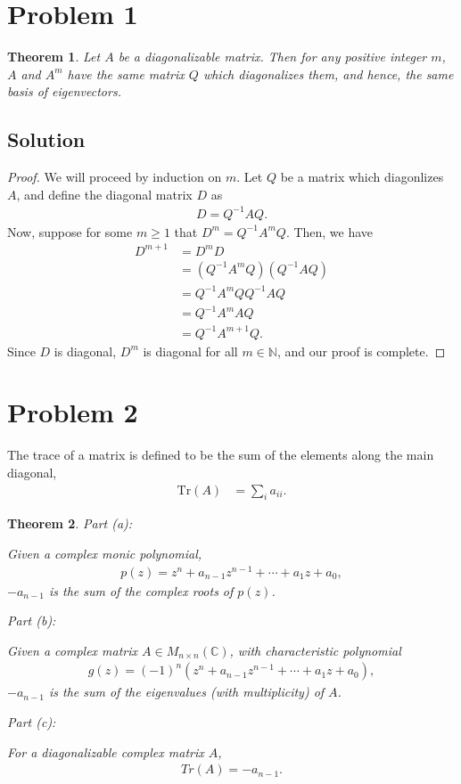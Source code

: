 \documentclass[10pt,a4paper]{article}
\author{Jeremiah Givens}
\makeatletter
\newtheorem{theorem}{Theorem}
\newcommand{\proofpart}[2]{%
  \par
  \addvspace{\medskipamount}%
  \noindent\emph{Part #1: #2}\par\nobreak
  \addvspace{\smallskipamount}%
  \@afterheading
}
\theoremstyle{definition}
\makeatother
\begin{document}
\section*{Problem 1}
\begin{theorem}
Let $A$ be a diagonalizable matrix. Then for any positive integer $m$, $A$ and $A^m$ have the same matrix $Q$ which diagonalizes them, and hence, the same basis of eigenvectors.
\end{theorem}

\subsection*{Solution}
\begin{proof}
We will proceed by induction on $m$. Let $Q$ be a matrix which diagonlizes $A$, and define the diagonal matrix $D$ as
\begin{align*}
D = Q^{-1} A Q.
\end{align*}
Now, suppose for some $m \geq 1$ that $D^m = Q^{-1} A^m Q$. Then, we have
\begin{align*}
D^{m + 1} &= D^{m} D\\
&= (Q^{-1} A^m Q)(Q^{-1} A Q)\\
&= Q^{-1} A^m QQ^{-1} A Q\\
&= Q^{-1} A^m A Q\\
&= Q^{-1} A^{m+1} Q.
\end{align*}
Since $D$ is diagonal, $D^m$ is diagonal for all $m \in \mathbb{N}$, and our proof is complete.
\end{proof}

\section*{Problem 2}
The trace of a matrix is defined to be the sum of the elements along the main diagonal,
\begin{align*}
\text{Tr}(A) &= \sum_{i} a_{ii}.
\end{align*}

\begin{theorem}
\proofpart{(a)}{} Given a complex monic polynomial,
\begin{align*}
p(z) = z^n + a_{n-1}z^{n-1} + \cdots + a_1 z + a_0,
\end{align*}
$-a_{n - 1}$ is the sum of the complex roots of $p(z)$.

\proofpart{(b)}{} Given a complex matrix $A \in M_{n \times n} (\mathbb{C})$, with characteristic polynomial 
\begin{align*}
g(z) = (-1)^{n} (z^n + a_{n-1}z^{n-1} + \cdots + a_1 z + a_0),
\end{align*}
$-a_{n-1}$ is the sum of the eigenvalues (with multiplicity) of $A$.

\proofpart{(c)}{} For a diagonalizable complex matrix $A$, 
\begin{align*}
Tr(A) = -a_{n-1}.
\end{align*}
\end{theorem}
\end{document}
